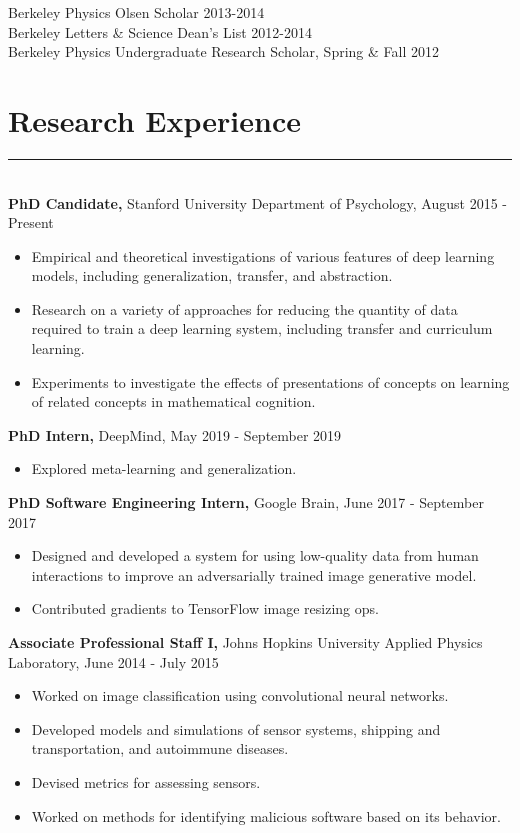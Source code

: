 \documentclass[margin]{res}
\begin{document}
\begin{resume}
Berkeley Physics Olsen Scholar 2013-2014 \\
Berkeley Letters \& Science Dean's List 2012-2014\\
Berkeley Physics Undergraduate Research Scholar, Spring \& Fall 2012
\vspace{1pt}\section{Research Experience} \vspace{-15pt} \rule{\textwidth}{0.5pt} \\[3pt]
{\bf PhD Candidate,} Stanford University Department of Psychology, August 2015 - Present 
\begin{itemize} \itemsep -2pt
  \item Empirical and theoretical investigations of various features of deep learning models, including generalization, transfer, and abstraction. 
  \item Research on a variety of approaches for reducing the quantity of data required to train a deep learning system, including transfer and curriculum learning.
  \item Experiments to investigate the effects of presentations of concepts on learning of related concepts in mathematical cognition.
\end{itemize}\vspace{-8pt}
{\bf PhD Intern,} DeepMind, May 2019 - September 2019
\begin{itemize} \itemsep -2pt
  \item Explored meta-learning and generalization.
\end{itemize}\vspace{-8pt}
{\bf PhD Software Engineering Intern,} Google Brain, June 2017 - September 2017 
\begin{itemize} \itemsep -2pt
  \item Designed and developed a system for using low-quality data from human interactions to improve an adversarially trained image generative model. 
  \item Contributed gradients to TensorFlow image resizing ops.
\end{itemize}\vspace{-8pt}
{\bf Associate Professional Staff I,} Johns Hopkins University Applied Physics Laboratory, June 2014 - July 2015 
\begin{itemize} \itemsep -2pt
 \item Worked on image classification using convolutional neural networks. \item Developed models and simulations of sensor systems, shipping and transportation, and autoimmune diseases. \item Devised metrics for assessing sensors. \item Worked on methods for identifying malicious software based on its behavior. \end{itemize}\vspace{-8pt}

\end{resume}
\end{document}
